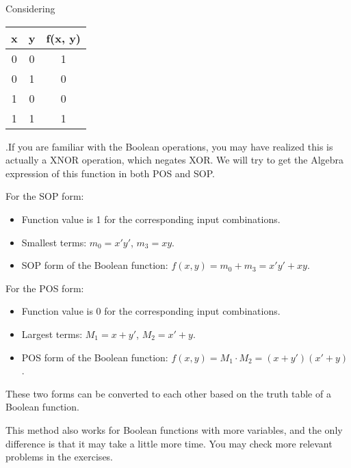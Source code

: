     \begin{example}
        Considering
        \begin{tabular}{|c|c|c|}
            \hline
            x & y & f(x, y) \\
            \hline
            0 & 0 & 1 \\
            \hline
            0 & 1 & 0 \\
            \hline
            1 & 0 & 0 \\
            \hline
            1 & 1 & 1 \\
            \hline
            \end{tabular}
            .If you are familiar with the Boolean operations, you may have realized this is actually a XNOR operation, which negates XOR.
            We will try to get the Algebra expression of this function in both POS and SOP.
             
    \end{example}
    \begin{solution}
                For the SOP form:
                \begin{itemize}
                    \item Function value is 1 for the corresponding input combinations.
                    \item Smallest terms: $m_0 = x'y'$, $m_3 = xy$.
                    \item SOP form of the Boolean function: $f(x, y) = m_0 + m_3 = x'y' + xy$.
                \end{itemize}
            
                For the POS form:
                \begin{itemize}
                    \item Function value is 0 for the corresponding input combinations.
                    \item Largest terms: $M_1 = x + y'$, $M_2 = x' + y$.
                    \item POS form of the Boolean function: $f(x, y) = M_1 \cdot M_2 = (x + y')(x' + y)$.
                \end{itemize}
                
             These two forms can be converted to each other based on the truth table of a Boolean function.
            \end{solution}

    This method also works for Boolean functions with more variables, and the only difference is that it may take a little more time.
    You may check more relevant problems in the exercises.
    
